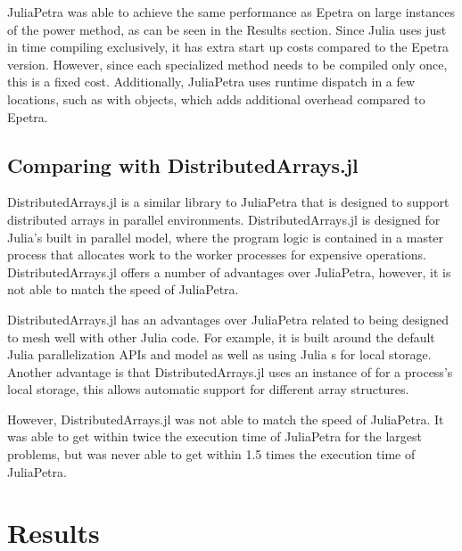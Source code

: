 \documentclass[acmsmall]{acmart}
\newcommand{\juliaSnippet}[1]{\texttt{\detokenize{#1}}}
\begin{document}
JuliaPetra was able to achieve the same performance as Epetra on large instances of the power method,
as can be seen in the Results section.
Since Julia uses just in time compiling exclusively, it has extra start up costs compared to
the Epetra version. However, since each specialized method needs to be compiled only once,
this is a fixed cost.
Additionally, JuliaPetra uses runtime dispatch in a few locations, such as with
\juliaSnippet{Comm} objects, which adds additional overhead compared to Epetra.

\subsection{Comparing with DistributedArrays.jl}

DistributedArrays.jl is a similar library to JuliaPetra that is designed to support
distributed arrays in parallel environments. \cite{DAGithub}
DistributedArrays.jl is designed for Julia's built in parallel model, where the program logic is
contained in a master process that allocates work to the worker processes for expensive operations.
\cite{JuliaFreshApproach}
DistributedArrays.jl offers a number of advantages over JuliaPetra, however, it is not able to
match the speed of JuliaPetra.

DistributedArrays.jl has an advantages over JuliaPetra related to being designed to mesh well
with other Julia code.
For example, it is built around the default Julia parallelization APIs and model as well as using
Julia \juliaSnippet{AbstractArray}s for local storage.
Another advantage is that DistributedArrays.jl uses an instance of \juliaSnippet{AbstractArray}
for a process's local storage, this allows automatic support for different array structures.

However, DistributedArrays.jl was not able to match the speed of JuliaPetra.
It was able to get within twice the execution time of JuliaPetra for the largest problems,
but was never able to get within 1.5 times the execution time of JuliaPetra.

\section{Results}
\end{document}
